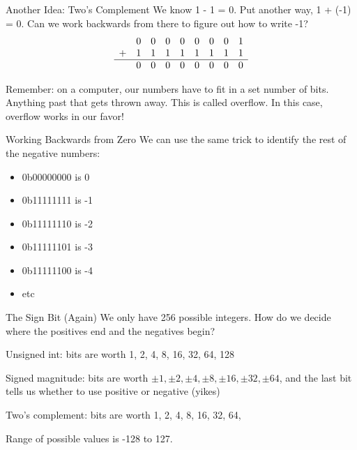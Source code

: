 \begin{frame}{Another Idea: Two's Complement}
	We know 1 - 1 = 0. Put another way, 1 + (-1) = 0. Can we work backwards from there to figure out how to write -1?
	\[
		\begin{array}{ccccccccc}
			  & 0 & 0 & 0 & 0 & 0 & 0 & 0 & 1 \\
			+ & 1 & 1 & 1 & 1 & 1 & 1 & 1 & 1 \\
			\hline
			  & 0 & 0 & 0 & 0 & 0 & 0 & 0 & 0 \\
		\end{array}
	\]

	Remember: on a computer, our numbers have to fit in a set number of bits.
	Anything past that gets thrown away. This is called overflow. In this case,
	overflow works in our favor!
\end{frame}

\begin{frame}{Working Backwards from Zero}
	We can use the same trick to identify the rest of the negative numbers:
	\begin{itemize}
		\item 0b00000000 is 0
		\item 0b11111111 is -1
		\item 0b11111110 is -2
		\item 0b11111101 is -3
		\item 0b11111100 is -4
		\item etc
	\end{itemize}

\end{frame}

\begin{frame}{The Sign Bit (Again)}
	We only have 256 possible integers. How do we decide where the positives end and the negatives begin?

	Unsigned int: bits are worth 1, 2, 4, 8, 16, 32, 64, 128

	Signed magnitude: bits are worth $\pm1, \pm2, \pm4, \pm8, \pm16, \pm32, \pm64$,
	and the last bit tells us whether to use positive or negative (yikes)

	Two's complement: bits are worth 1, 2, 4, 8, 16, 32, 64, 

	Range of possible values is -128 to 127.
\end{frame}

